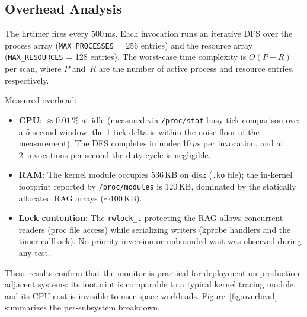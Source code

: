 \documentclass[11pt,letterpaper]{article}
\begin{document}
\subsection{Overhead Analysis}

The hrtimer fires every 500\,ms.  Each invocation runs an iterative DFS
over the process array (\texttt{MAX\_PROCESSES} = 256 entries) and the
resource array (\texttt{MAX\_RESOURCES} = 128 entries).  The worst-case
time complexity is $O(P + R)$ per scan, where $P$ and~$R$ are the
number of active process and resource entries, respectively.

Measured overhead:

\begin{itemize}
\item \textbf{CPU}: $\approx 0.01$\,\% at idle (measured via
  \texttt{/proc/stat} busy-tick comparison over a 5-second window; the
  1-tick delta is within the noise floor of the measurement).  The DFS
  completes in under 10\,$\mu$s per invocation, and at 2~invocations
  per second the duty cycle is negligible.
\item \textbf{RAM}: The kernel module occupies 536\,KB on disk
  (\texttt{.ko} file); the in-kernel footprint reported by
  \texttt{/proc/modules} is 120\,KB, dominated by the statically
  allocated RAG arrays ($\sim$100\,KB).
\item \textbf{Lock contention}: The \texttt{rwlock\_t} protecting the
  RAG allows concurrent readers (proc file access) while serializing
  writers (kprobe handlers and the timer callback).  No priority
  inversion or unbounded wait was observed during any test.
\end{itemize}

These results confirm that the monitor is practical for deployment on
production-adjacent systems: its footprint is comparable to a typical
kernel tracing module, and its CPU cost is invisible to user-space
workloads.  Figure~\ref{fig:overhead} summarizes the per-subsystem
breakdown.
\end{document}
